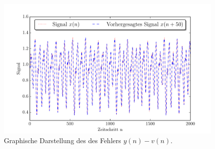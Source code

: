 \begin{figure}[H]
    \centering
    \includegraphics[width = 0.9 \textwidth]{figures/mackeyglass_pred.pdf}
    \caption{Graphische Darstellung des des Fehlers $y(n)-v(n)$.}
    \label{fig:application_mackeyglass}
\end{figure}